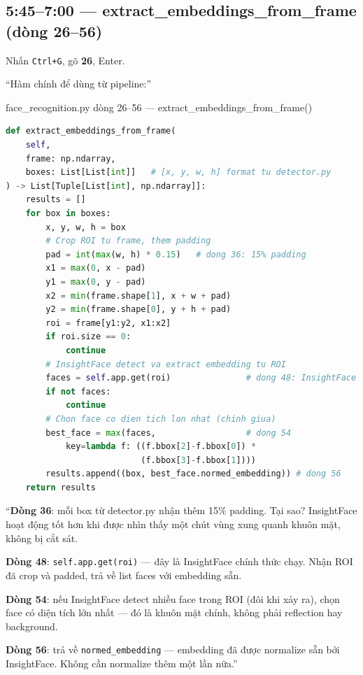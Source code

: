 \documentclass[12pt, a4paper]{article}
\begin{document}
\subsection{5:45--7:00 --- extract\_embeddings\_from\_frame (dòng 26--56)}

\begin{doact}
Nhấn \texttt{Ctrl+G}, gõ \textbf{26}, Enter.
\end{doact}

\begin{say}
``Hàm chính để dùng từ pipeline:''
\end{say}

\begin{code}{face\_recognition.py dòng 26--56 --- extract\_embeddings\_from\_frame()}
\begin{lstlisting}[language=Python, firstnumber=26]
def extract_embeddings_from_frame(
    self,
    frame: np.ndarray,
    boxes: List[List[int]]   # [x, y, w, h] format tu detector.py
) -> List[Tuple[List[int], np.ndarray]]:
    results = []
    for box in boxes:
        x, y, w, h = box
        # Crop ROI tu frame, them padding
        pad = int(max(w, h) * 0.15)   # dong 36: 15% padding
        x1 = max(0, x - pad)
        y1 = max(0, y - pad)
        x2 = min(frame.shape[1], x + w + pad)
        y2 = min(frame.shape[0], y + h + pad)
        roi = frame[y1:y2, x1:x2]
        if roi.size == 0:
            continue
        # InsightFace detect va extract embedding tu ROI
        faces = self.app.get(roi)               # dong 48: InsightFace
        if not faces:
            continue
        # Chon face co dien tich lon nhat (chinh giua)
        best_face = max(faces,                  # dong 54
            key=lambda f: ((f.bbox[2]-f.bbox[0]) *
                           (f.bbox[3]-f.bbox[1])))
        results.append((box, best_face.normed_embedding)) # dong 56
    return results
\end{lstlisting}
\end{code}

\begin{say}
``\textbf{Dòng 36}: mỗi box từ detector.py nhận thêm 15\% padding.
Tại sao? InsightFace hoạt động tốt hơn khi được nhìn thấy
một chút vùng xung quanh khuôn mặt, không bị cắt sát.

\textbf{Dòng 48}: \texttt{self.app.get(roi)} --- đây là InsightFace chính thức chạy.
Nhận ROI đã crop và padded, trả về list faces với embedding sẵn.

\textbf{Dòng 54}: nếu InsightFace detect nhiều face trong ROI (đôi khi xảy ra),
chọn face có diện tích lớn nhất --- đó là khuôn mặt chính, không phải reflection hay background.

\textbf{Dòng 56}: trả về \texttt{normed\_embedding} --- embedding đã được normalize sẵn bởi InsightFace.
Không cần normalize thêm một lần nữa.''
\end{say}
\end{document}
